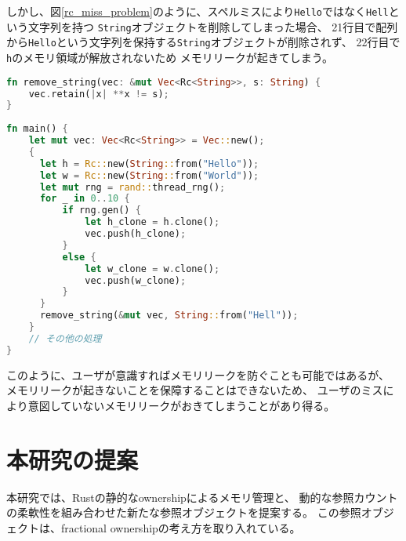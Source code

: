 \documentclass{sumiilab-paper}
\theoremstyle{mystyle}
\numberwithin{definition}{chapter} %
\begin{document}
しかし、図\ref{rc_miss_problem}のように、スペルミスにより\texttt{Hello}ではなく\texttt{Hell}という文字列を持つ
\texttt{String}オブジェクトを削除してしまった場合、
21行目で配列から\texttt{Hello}という文字列を保持する\texttt{String}オブジェクトが削除されず、
22行目で\texttt{h}のメモリ領域が解放されないため
メモリリークが起きてしまう。
\begin{lstlisting}[language=Rust, caption=Rcオブジェクトを利用する際の問題点, 
  label=rc_miss_problem, captionpos=b]
fn remove_string(vec: &mut Vec<Rc<String>>, s: String) {
    vec.retain(|x| **x != s);
}
  
fn main() {
    let mut vec: Vec<Rc<String>> = Vec::new();
    {
      let h = Rc::new(String::from("Hello"));
      let w = Rc::new(String::from("World"));
      let mut rng = rand::thread_rng();
      for _ in 0..10 {
          if rng.gen() {
              let h_clone = h.clone();
              vec.push(h_clone);
          }
          else {
              let w_clone = w.clone();
              vec.push(w_clone);
          }
      }
      remove_string(&mut vec, String::from("Hell"));
    }
    // その他の処理
}
\end{lstlisting}
このように、ユーザが意識すればメモリリークを防ぐことも可能ではあるが、
メモリリークが起きないことを保障することはできないため、
ユーザのミスにより意図していないメモリリークがおきてしまうことがあり得る。


\chapter{本研究の提案}
本研究では、Rustの静的なownershipによるメモリ管理と、
動的な参照カウントの柔軟性を組み合わせた新たな参照オブジェクトを提案する。
この参照オブジェクトは、fractional ownershipの考え方を取り入れている。


\end{document}
